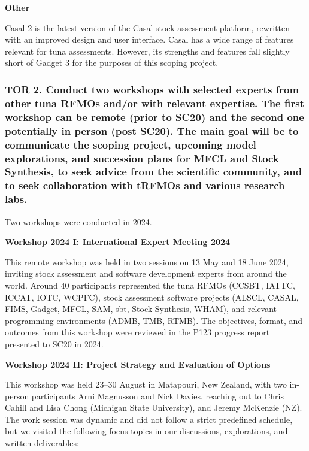 \documentclass{SCreport}
\begin{document}
\textbf{Other}

\vspace{-1ex}

Casal 2 is the latest version of the Casal stock assessment platform, rewritten
with an improved design and user interface. Casal has a wide range of features
relevant for tuna assessments. However, its strengths and features fall slightly
short of Gadget 3 for the purposes of this scoping project.

\vspace{1ex}

\subsubsection{TOR 2. Conduct two workshops with selected experts from other
  tuna RFMOs and/or with relevant expertise. The first workshop can be remote
  (prior to SC20) and the second one potentially in person (post SC20). The main
  goal will be to communicate the scoping project, upcoming model explorations,
  and succession plans for MFCL and Stock Synthesis, to seek advice from the
  scientific community, and to seek collaboration with tRFMOs and various
  research labs.}

\vspace{1ex}

Two workshops were conducted in 2024.

\vspace{1ex}

\textbf{Workshop 2024 I: International Expert Meeting 2024}

This remote workshop was held in two sessions on 13 May and 18 June 2024,
inviting stock assessment and software development experts from around the
world. Around 40 participants represented the tuna RFMOs (CCSBT, IATTC, ICCAT,
IOTC, WCPFC), stock assessment software projects (ALSCL, CASAL, FIMS, Gadget,
MFCL, SAM, sbt, Stock Synthesis, WHAM), and relevant programming environments
(ADMB, TMB, RTMB). The objectives, format, and outcomes from this workshop were
reviewed in the P123 progress report presented to SC20 in 2024.

\vspace{1ex}

\textbf{Workshop 2024 II: Project Strategy and Evaluation of Options}

\vspace{1ex}

This workshop was held 23--30 August in Matapouri, New Zealand, with two
in-person participants Arni Magnusson and Nick Davies, reaching out to Chris
Cahill and Lisa Chong (Michigan State University), and Jeremy McKenzie (NZ). The
work session was dynamic and did not follow a strict predefined schedule, but we
visited the following focus topics in our discussions, explorations, and written
deliverables:
\end{document}
